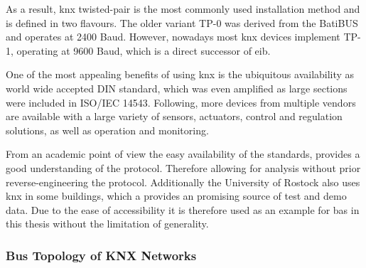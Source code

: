 As a result, \gls{knx} twisted-pair is the most commonly used installation method and is defined in two flavours. \parencite{DIN_EN_50090-5-2}
The older variant TP-0 was derived from the BatiBUS  and operates at 2400 Baud. However, nowadays most \gls{knx} devices implement TP-1, operating at 9600 Baud, which is a direct successor of \gls{eib}.

One of the most appealing benefits of using \gls{knx} is the ubiquitous availability as world wide accepted DIN standard, which was even amplified as large sections were included in ISO/IEC 14543.
Following, more devices from multiple vendors are available with a large variety of sensors, actuators, control and regulation solutions, as well as operation and monitoring.

From an academic point of view the easy availability of the standards, provides a good understanding of the protocol. Therefore allowing for analysis without prior reverse-engineering the protocol.
Additionally the University of Rostock also uses \gls{knx} in some buildings, which a provides an promising source of test and demo data. \parencite[cf.][]{Mundt2012}
Due to the ease of accessibility it is therefore used as an example for \gls{bas} in this thesis without the limitation of generality.

\subsubsection{Bus Topology of KNX Networks}
\label{sec:background:bas:knx:topo}

